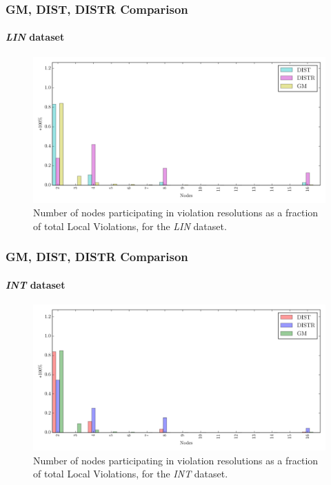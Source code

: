 \documentclass[hyperref={pdfpagelabels=false}]{beamer}
\begin{document}
\begin{frame} \frametitle{GM, DIST, DISTR Comparison} \framesubtitle{\emph{LIN} dataset}
\begin{figure}
\vspace{-0.2cm}
\centering
\includegraphics[scale=0.4]{../img/matchings_matchings_linear.pdf}
  \caption{Number of nodes participating in violation resolutions as a fraction of total Local Violations, for the \emph{LIN} dataset.}
\end{figure}
\end{frame}

\begin{frame} \frametitle{GM, DIST, DISTR Comparison}\framesubtitle{\emph{INT} dataset}
\begin{figure}
\vspace{-0.2cm}
\centering
\includegraphics[scale=0.4]{../img/matchings_matchings_interweaving.pdf}
  \caption{Number of nodes participating in violation resolutions as a fraction of total Local Violations, for the \emph{INT} dataset.}
\end{figure}
\end{frame}
\end{document}
